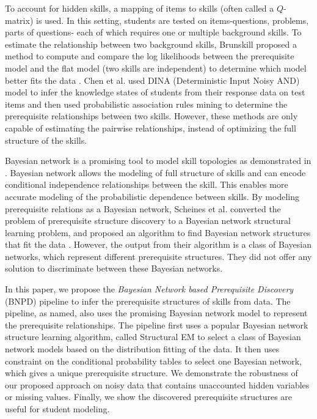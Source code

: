 \documentclass{edm_template}
\begin{document}
To account for hidden skills, a mapping of items to skills (often called a $Q$-matrix) is used.
In this setting, students are tested on items-questions, problems, parts of questions- 
each of which requires one or multiple background skills.
To estimate the relationship between two background skills, 
Brunskill proposed a method to compute and compare the log likelihoods between the prerequisite model and the flat model (two skills are independent) to determine which model better fits the data \cite{brunskill2010estimating}. 
Chen et al. \cite{chen2015discovering} used DINA (Deterministic Input Noisy AND) model to infer the knowledge states of students from their response data
on test items and then used probabilistic association rules mining to determine the prerequisite relationships between two skills.
However, these methods are only capable of estimating the pairwise relationships, instead of optimizing the full structure of the skills.

Bayesian network is a promising tool to model skill topologies as demonstrated in \cite{kaser2014beyond}.
Bayesian network allows the modeling of full structure of skills and can encode conditional independence relationships between the skill.
This enables more accurate modeling of the probabilistic dependence between skills.
By modeling prerequisite relations as a Bayesian network, Scheines et al. converted the problem of prerequisite structure discovery to a Bayesian network structural learning problem, and proposed an algorithm to find Bayesian network structures that fit the data \cite{scheines2014discovering}.
However, the output from their algorithm is a class of Bayesian networks, which represent different prerequisite structures.
They did not offer any solution to discriminate between these Bayesian networks.

In this paper, we propose the \emph{Bayesian Network based Prerequisite Discovery} (BNPD) pipeline to infer the prerequisite structures of skills from data. 
The pipeline, as named,  also uses the promising Bayesian network model to represent the prerequisite relationships.
The pipeline first uses a popular Bayesian network structure learning algorithm, 
called Structural EM to select a class of Bayesian network models based on the distribution fitting of the data.
It then uses constraint on the conditional probability tables to select one Bayesian network, which gives a unique prerequisite structure.
We demonstrate the robustness of our proposed approach on noisy data that contains unaccounted hidden variables or missing values.
Finally, we show the discovered prerequisite structures are useful for student modeling.
\end{document}
